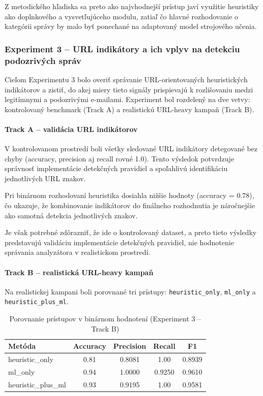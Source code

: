\documentclass[conference]{IEEEtran}
\begin{document}
Z metodického hľadiska sa preto ako najvhodnejší prístup javí využitie heuristiky ako doplnkového a vysvetľujúceho modulu, zatiaľ čo hlavné rozhodovanie o kategórii správy by malo byť ponechané na adaptovaný model strojového učenia.


\subsubsection{Experiment 3 – URL indikátory a ich vplyv na detekciu podozrivých správ}\label{epx3}

Cieľom Experimentu 3 bolo overiť správanie URL-orientovaných heuristických indikátorov a zistiť, do akej miery tieto signály prispievajú k rozlišovaniu medzi legitímnymi a podozrivými e-mailami. Experiment bol rozdelený na dve vetvy: kontrolovaný benchmark (Track A) a realistickú URL-heavy kampaň (Track B).

\paragraph{Track A – validácia URL indikátorov}

V kontrolovanom prostredí boli všetky sledované URL indikátory detegované bez chyby (accuracy, precision aj recall rovné 1.0). Tento výsledok potvrdzuje správnosť implementácie detekčných pravidiel a spoľahlivú identifikáciu jednotlivých URL znakov.

Pri binárnom rozhodovaní heuristika dosiahla nižšie hodnoty (accuracy = 0.78), čo ukazuje, že kombinovanie indikátorov do finálneho rozhodnutia je náročnejšie ako samotná detekcia jednotlivých znakov.

Je však potrebné zdôrazniť, že ide o kontrolovaný dataset, a preto tieto výsledky predstavujú validáciu implementácie detekčných pravidiel, nie hodnotenie správania analyzátora v realistickom prostredí.

\paragraph{Track B – realistická URL-heavy kampaň}

Na realistickej kampani boli porovnané tri prístupy: \texttt{heuristic\_only}, \texttt{ml\_only} a \texttt{heuristic\_plus\_ml}.

\begin{table}[h]
\centering
\caption{Porovnanie prístupov v binárnom hodnotení (Experiment 3 – Track B)}
\begin{tabular}{lcccc}
\hline
Metóda & Accuracy & Precision & Recall & F1 \\
\hline
heuristic\_only & 0.81 & 0.8081 & 1.00 & 0.8939 \\
ml\_only & 0.94 & 1.0000 & 0.9250 & 0.9610 \\
heuristic\_plus\_ml & 0.93 & 0.9195 & 1.00 & 0.9581 \\
\hline
\end{tabular}
\end{table}
\end{document}
